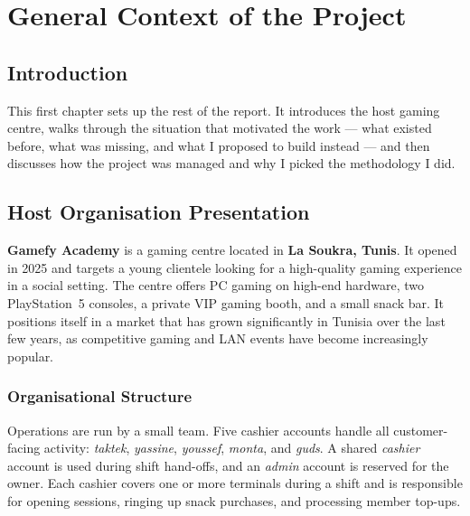 \documentclass[12pt, a4paper]{report}
\begin{document}
\chapter{General Context of the Project}

\section{Introduction}

This first chapter sets up the rest of the report. It introduces the host gaming
centre, walks through the situation that motivated the work — what existed
before, what was missing, and what I proposed to build instead — and then
discusses how the project was managed and why I picked the methodology I did.

\section{Host Organisation Presentation}

\textbf{Gamefy Academy} is a gaming centre located in \textbf{La Soukra, Tunis}.
It opened in 2025 and targets a young clientele looking for a high-quality gaming
experience in a social setting. The centre offers PC gaming on high-end hardware,
two PlayStation~5 consoles, a private VIP gaming booth, and a small snack bar.
It positions itself in a market that has grown significantly in Tunisia over the
last few years, as competitive gaming and LAN events have become increasingly
popular.


\subsection{Organisational Structure}

Operations are run by a small team. Five cashier accounts handle all
customer-facing activity: \textit{taktek}, \textit{yassine}, \textit{youssef},
\textit{monta}, and \textit{guds}. A shared \textit{cashier} account is used during
shift hand-offs, and an \textit{admin} account is reserved for the owner. Each
cashier covers one or more terminals during a shift and is responsible for opening
sessions, ringing up snack purchases, and processing member top-ups.
\end{document}
